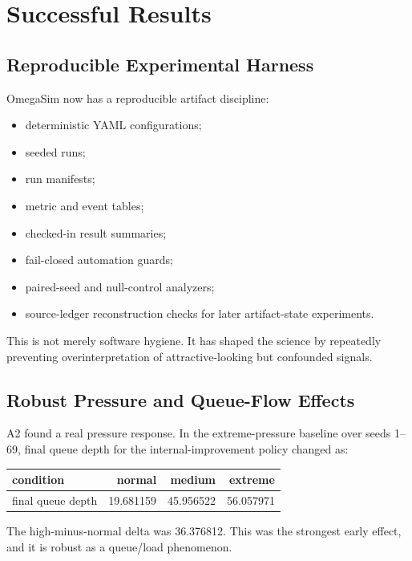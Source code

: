 \documentclass[11pt]{article}
\begin{document}
\section{Successful Results}

\subsection{Reproducible Experimental Harness}

OmegaSim now has a reproducible artifact discipline:

\begin{itemize}
\item deterministic YAML configurations;
\item seeded runs;
\item run manifests;
\item metric and event tables;
\item checked-in result summaries;
\item fail-closed automation guards;
\item paired-seed and null-control analyzers;
\item source-ledger reconstruction checks for later artifact-state experiments.
\end{itemize}

This is not merely software hygiene. It has shaped the science by repeatedly
preventing overinterpretation of attractive-looking but confounded signals.

\subsection{Robust Pressure and Queue-Flow Effects}

A2 found a real pressure response. In the extreme-pressure baseline over seeds
1--69, final queue depth for the internal-improvement policy changed as:

\begin{center}
\begin{tabular}{lrrr}
condition & normal & medium & extreme \\
\hline
final queue depth & 19.681159 & 45.956522 & 56.057971 \\
\end{tabular}
\end{center}

The high-minus-normal delta was 36.376812. This was the strongest early
effect, and it is robust as a queue/load phenomenon.
\end{document}
